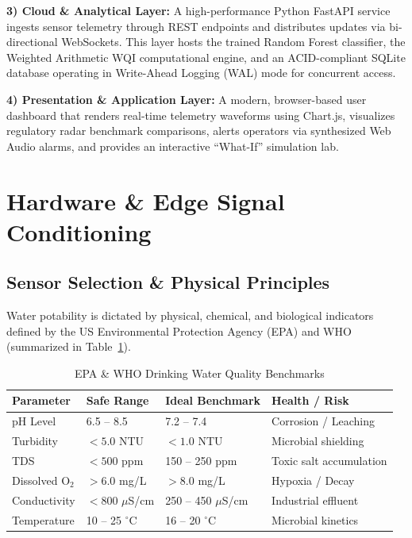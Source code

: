 \documentclass[conference]{IEEEtran}
\begin{document}
\textbf{3) Cloud \& Analytical Layer:} A high-performance Python FastAPI service ingests sensor telemetry through REST endpoints and distributes updates via bi-directional WebSockets. This layer hosts the trained Random Forest classifier, the Weighted Arithmetic WQI computational engine, and an ACID-compliant SQLite database operating in Write-Ahead Logging (WAL) mode for concurrent access.

\textbf{4) Presentation \& Application Layer:} A modern, browser-based user dashboard that renders real-time telemetry waveforms using Chart.js, visualizes regulatory radar benchmark comparisons, alerts operators via synthesized Web Audio alarms, and provides an interactive ``What-If'' simulation lab.

\section{Hardware \& Edge Signal Conditioning}

\subsection{Sensor Selection \& Physical Principles}
Water potability is dictated by physical, chemical, and biological indicators defined by the US Environmental Protection Agency (EPA) and WHO (summarized in Table~\ref{tab:standards}).

\begin{table}[htbp]
\caption{EPA \& WHO Drinking Water Quality Benchmarks}
\label{tab:standards}
\centering
\begin{tabular}{@{}llll@{}}
\toprule
\textbf{Parameter} & \textbf{Safe Range} & \textbf{Ideal Benchmark} & \textbf{Health / Risk} \\ \midrule
pH Level & 6.5 -- 8.5 & 7.2 -- 7.4 & Corrosion / Leaching \\
Turbidity & $< 5.0$ NTU & $< 1.0$ NTU & Microbial shielding \\
TDS & $< 500$ ppm & 150 -- 250 ppm & Toxic salt accumulation \\
Dissolved O$_2$ & $> 6.0$ mg/L & $> 8.0$ mg/L & Hypoxia / Decay \\
Conductivity & $< 800$ $\mu$S/cm & 250 -- 450 $\mu$S/cm & Industrial effluent \\
Temperature & 10 -- 25 $^\circ$C & 16 -- 20 $^\circ$C & Microbial kinetics \\ \bottomrule
\end{tabular}
\end{table}
\end{document}
